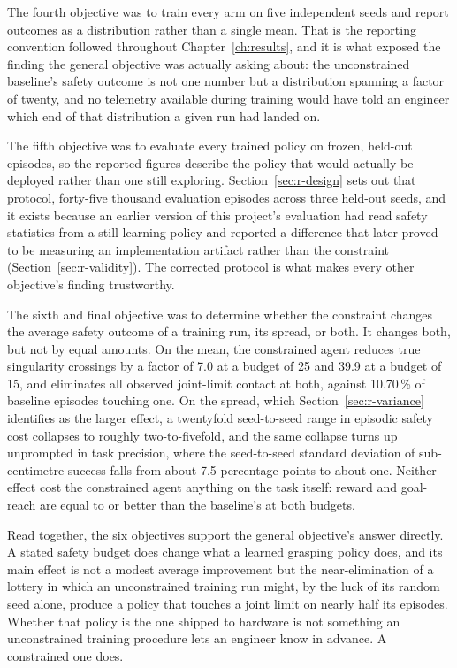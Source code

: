 The fourth objective was to train every arm on five independent seeds and report outcomes as a
distribution rather than a single mean. That is the reporting convention followed throughout
Chapter~\ref{ch:results}, and it is what exposed the finding the general objective was actually
asking about: the unconstrained baseline's safety outcome is not one number but a distribution
spanning a factor of twenty, and no telemetry available during training would have told an
engineer which end of that distribution a given run had landed on.

The fifth objective was to evaluate every trained policy on frozen, held-out episodes, so the
reported figures describe the policy that would actually be deployed rather than one still
exploring. Section~\ref{sec:r-design} sets out that protocol, forty-five thousand evaluation
episodes across three held-out seeds, and it exists because an earlier version of this project's
evaluation had read safety statistics from a still-learning policy and reported a difference that
later proved to be measuring an implementation artifact rather than the constraint
(Section~\ref{sec:r-validity}). The corrected protocol is what makes every other objective's
finding trustworthy.

The sixth and final objective was to determine whether the constraint changes the average safety
outcome of a training run, its spread, or both. It changes both, but not by equal amounts. On the
mean, the constrained agent reduces true singularity crossings by a factor of 7.0 at a budget of
25 and 39.9 at a budget of 15, and eliminates all observed joint-limit contact at both, against
10.70\,\% of baseline episodes touching one. On the spread, which Section~\ref{sec:r-variance}
identifies as the larger effect, a twentyfold seed-to-seed range in episodic safety cost collapses
to roughly two-to-fivefold, and the same collapse turns up unprompted in task precision, where the
seed-to-seed standard deviation of sub-centimetre success falls from about 7.5 percentage points
to about one. Neither effect cost the constrained agent anything on the task itself: reward and
goal-reach are equal to or better than the baseline's at both budgets.

Read together, the six objectives support the general objective's answer directly. A stated safety
budget does change what a learned grasping policy does, and its main effect is not a modest
average improvement but the near-elimination of a lottery in which an unconstrained training run
might, by the luck of its random seed alone, produce a policy that touches a joint limit on nearly
half its episodes. Whether that policy is the one shipped to hardware is not something an
unconstrained training procedure lets an engineer know in advance. A constrained one does.

